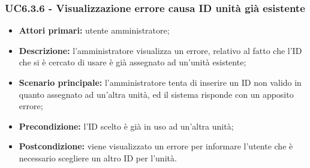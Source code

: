 \subsubsection{UC6.3.6 - Visualizzazione errore causa ID unità già esistente}
	\begin{itemize}
		\item \textbf{Attori primari:} utente amministratore;
		\item \textbf{Descrizione:} l'amministratore visualizza un errore, relativo al fatto che l'ID che si è cercato di usare è già assegnato ad un'unità esistente;
		\item \textbf{Scenario principale:} l'amministratore tenta di inserire un ID non valido in quanto assegnato ad un'altra unità, ed il sistema risponde con un apposito errore;
		\item \textbf{Precondizione:} l'ID scelto è già in uso ad un'altra unità;
		\item \textbf{Postcondizione:} viene visualizzato un errore per informare l'utente che è necessario scegliere un altro ID per l'unità.
	\end{itemize}